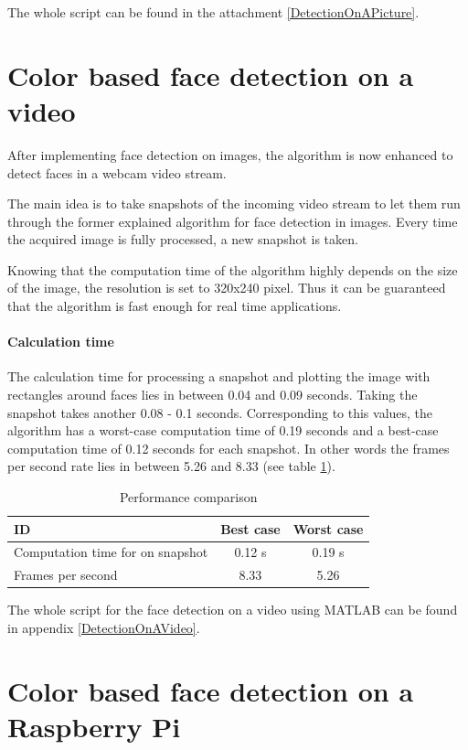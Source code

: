 \documentclass[SensorSystemsProject.tex]{subfiles}
\begin{document}
\medskip
The whole script can be found in the attachment \ref{DetectionOnAPicture}.


\section{Color based face detection on a video}
After implementing face detection on images, the algorithm is now enhanced to detect faces in a webcam video stream. 

The main idea is to take snapshots of the incoming video stream to let them run through the former explained algorithm for face detection in images. Every time the acquired image is fully processed, a new snapshot is taken. 

Knowing that the computation time of the algorithm highly depends on the size of the image, the resolution is set to 320x240 pixel. Thus it can be guaranteed that the algorithm is fast enough for real time applications.

\paragraph{Calculation time}
The calculation time for processing a snapshot and plotting the image with rectangles around faces lies in between 0.04 and 0.09 seconds. Taking the snapshot takes another 0.08 - 0.1 seconds. 
Corresponding to this values, the algorithm has a worst-case computation time of 0.19 seconds and a best-case computation time of 0.12 seconds for each snapshot. In other words the frames per second rate lies in between 5.26 and 8.33 (see table \ref{performanceComparison}).

\begin{table}[!h]
\centering
	\begin{tabular}{|l|c|c|}
	\hline 
	ID & Best case & Worst case \\ 
	\hline 
	Computation time for on snapshot & 0.12 s & 0.19 s \\ 
	\hline 
	Frames per second	&8.33	&5.26\\
	\hline
	\end{tabular} 
\caption{Performance comparison}
\label{performanceComparison}
\end{table}


The whole script for the face detection on a video using MATLAB can be found in appendix \ref{DetectionOnAVideo}.



\section{Color based face detection on a Raspberry Pi}
\end{document}

